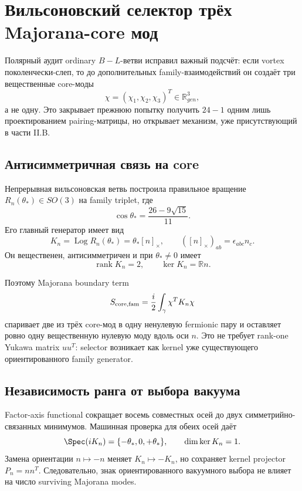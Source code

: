 \chapter{Вильсоновский селектор трёх Majorana-core мод}

Полярный аудит ordinary \(B-L\)-ветви исправил важный подсчёт: если vortex
поколенчески-слеп, то до дополнительных family-взаимодействий он создаёт
три вещественные core-моды
\begin{equation}
 \chi=(\chi_1,\chi_2,\chi_3)^T\in\mathbb R^3_{gen},
\end{equation}
а не одну. Это закрывает прежнюю попытку получить \(24-1\) одним лишь
проектированием pairing-матрицы, но открывает механизм, уже присутствующий
в части II.B.

\section{Антисимметричная связь на core}

Непрерывная вильсоновская ветвь построила правильное вращение
\(R_n(\theta_*)\in SO(3)\) на family triplet, где
\begin{equation}
 \cos\theta_*=\frac{26-9\sqrt{15}}{11}.
\end{equation}
Его главный генератор имеет вид
\begin{equation}
 K_n=\operatorname{Log}R_n(\theta_*)
     =\theta_*[n]_\times,
 \qquad
 ([n]_\times)_{ab}=\epsilon_{abc}n_c.
\end{equation}
Он вещественен, антисимметричен и при \(\theta_*\ne0\) имеет
\begin{equation}
 \operatorname{rank}K_n=2,
 \qquad
 \ker K_n=\mathbb R n.
\end{equation}

Поэтому Majorana boundary term
\begin{equation}
 S_{\rm core,fam}
 =\frac{i}{2}\int_\gamma \chi^T K_n\chi
\end{equation}
спаривает две из трёх core-мод в одну ненулевую fermionic пару и оставляет
ровно одну вещественную нулевую моду вдоль оси \(n\). Это не требует
rank-one Yukawa matrix \(uu^T\): selector возникает как kernel уже
существующего ориентированного family generator.

\section{Независимость ранга от выбора вакуума}

Factor-axis functional сокращает восемь совместных осей до двух
симметрийно-связанных минимумов. Машинная проверка для обеих осей даёт
\begin{equation}
 \Spec(iK_n)=\{-\theta_*,0,+\theta_*\},
 \qquad
 \dim\ker K_n=1.
\end{equation}
Замена ориентации \(n\mapsto-n\) меняет \(K_n\mapsto-K_n\), но сохраняет
kernel projector \(P_n=nn^T\). Следовательно, знак ориентированного
вакуумного выбора не влияет на число surviving Majorana modes.

